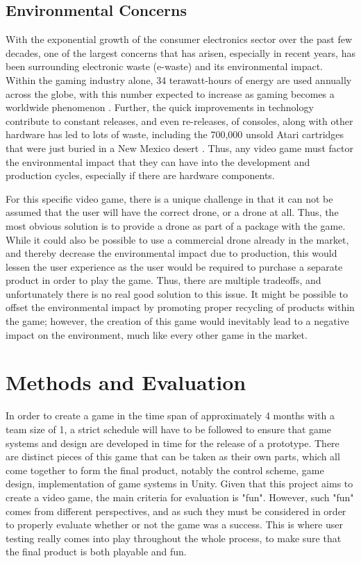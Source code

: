 \documentclass[10pt,twocolumn]{article}
\begin{document}
\subsection{Environmental Concerns}
With the exponential growth of the consumer electronics sector over the past few decades, one of the largest concerns that has arisen, especially in recent years, has been surrounding electronic waste (e-waste) and its environmental impact. Within the gaming industry alone, 34 terawatt-hours of energy are used annually across the globe, with this number expected to increase as gaming becomes a worldwide phenomenon \cite{GamingEWaste}. Further, the quick improvements in technology contribute to constant releases, and even re-releases, of consoles, along with other hardware has led to lots of waste, including the 700,000 unsold Atari cartridges that were just buried in a New Mexico desert \cite{GamingEWaste}. Thus, any video game must factor the environmental impact that they can have into the development and production cycles, especially if there are hardware components. 

For this specific video game, there is a unique challenge in that it can not be assumed that the user will have the correct drone, or a drone at all. Thus, the most obvious solution is to provide a drone as part of a package with the game. While it could also be possible to use a commercial drone already in the market, and thereby decrease the environmental impact due to production, this would lessen the user experience as the user would be required to purchase a separate product in order to play the game. Thus, there are multiple tradeoffs, and unfortunately there is no real good solution to this issue. It might be possible to offset the environmental impact by promoting proper recycling of products within the game; however, the creation of this game would inevitably lead to a negative impact on the environment, much like every other game in the market.


\section{Methods and Evaluation}
In order to create a game in the time span of approximately 4 months with a team size of 1, a strict schedule will have to be followed to ensure that game systems and design are developed in time for the release of a prototype. There are distinct pieces of this game that can be taken as their own parts, which all come together to form the final product, notably the control scheme, game design, implementation of game systems in Unity. Given that this project aims to create a video game, the main criteria for evaluation is "fun". However, such "fun" comes from different perspectives, and as such they must be considered in order to properly evaluate whether or not the game was a success. This is where user testing really comes into play throughout the whole process, to make sure that the final product is both playable and fun.
\end{document}
